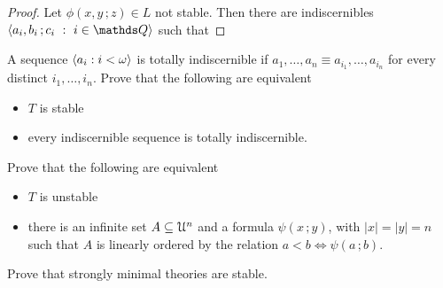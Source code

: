 \begin{proof}
  Let  $\phi(x,y\,;z)\in L$ not stable.
  Then there are indiscernibles $\<a_i,b_i\,;c_i\ :\ i\in\QQ\>$ such that 
\end{proof}

\begin{exercise}
  A sequence $\langle a_i:i<\omega\rangle$ is totally indiscernible if $a_1,\dots,a_n\equiv a_{i_1},\dots,a_{i_n}$ for every distinct $i_1,\dots,i_n$.
  Prove that the following are equivalent
  \begin{itemize}
  \item[1.] $T$ is stable
  \item[2.] every indiscernible sequence is totally indiscernible.
  \end{itemize}
\end{exercise}

\begin{exercise}\label{ex_stable_orderproperty}
Prove that the following are equivalent
\begin{itemize}
\item[1.] $T$ is unstable
\item[2.] there is an infinite set $A\subseteq\EuScript U^n$ and a formula  $\psi(x\,;y)$, with $|x|=|y|=n$ such that $A$ is linearly ordered by the relation $a<b\iff\psi(a\,;b)$.
\end{itemize}
\end{exercise}

\begin{exercise}
Prove that strongly minimal theories are stable.
\end{exercise}

